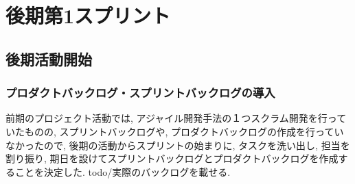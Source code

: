 \section{後期第1スプリント}
\subsection{後期活動開始}
\subsubsection{プロダクトバックログ・スプリントバックログの導入}
前期のプロジェクト活動では, アジャイル開発手法の１つスクラム開発を行っていたものの, スプリントバックログや, プロダクトバックログの作成を行っていなかったので,
後期の活動からスプリントの始まりに, タスクを洗い出し, 担当を割り振り, 期日を設けてスプリントバックログとプロダクトバックログを作成することを決定した. todo/実際のバックログを載せる.

